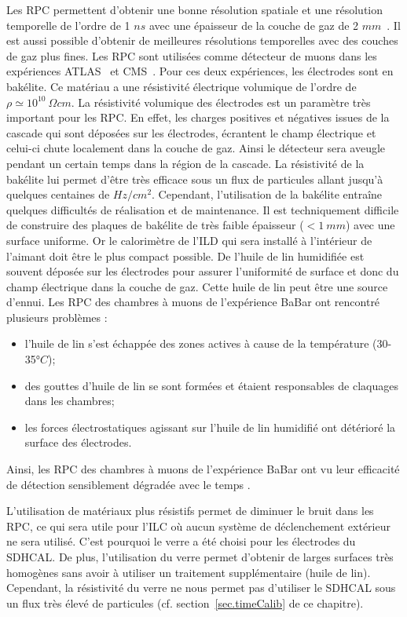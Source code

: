 Les RPC permettent d'obtenir une bonne résolution spatiale et une résolution temporelle de l'ordre de 1 $ns$ avec une épaisseur de la couche de gaz de 2 $mm$~\cite{riegler}. Il est aussi possible d'obtenir de meilleures résolutions temporelles avec des couches de gaz plus fines. Les RPC sont utilisées comme détecteur de muons dans les expériences ATLAS~\cite{atlas} et CMS~\cite{cms}. Pour ces deux expériences, les électrodes sont en bakélite. Ce matériau a une résistivité électrique volumique de l'ordre de $\rho\simeq10^{10}~\Omega cm$. La résistivité volumique des électrodes est un paramètre très important pour les RPC. En effet, les charges positives et négatives issues de la cascade qui sont déposées sur les électrodes, écrantent le champ électrique et celui-ci chute localement dans la couche de gaz. Ainsi le détecteur sera aveugle pendant un certain temps dans la région de la cascade. La résistivité de la bakélite lui permet d'être très efficace sous un flux de particules allant jusqu'à quelques centaines de $Hz/cm^2$. Cependant, l'utilisation de la bakélite entraîne quelques difficultés de réalisation et de maintenance. Il est techniquement difficile de construire des plaques de bakélite de très faible épaisseur ($<1~mm$) avec une surface uniforme. Or le calorimètre de l'ILD qui sera installé à l'intérieur de l'aimant doit être le plus compact possible. De l'huile de lin humidifiée est souvent déposée sur les électrodes pour assurer l'uniformité de surface et donc du champ électrique dans la couche de gaz. Cette huile de lin peut être une source d'ennui. Les RPC des chambres à muons de l'expérience BaBar ont rencontré plusieurs problèmes \cite{vavra}: 
\begin{itemize}
\item l'huile de lin s'est échappée des zones actives à cause de la température (30-35$°C$);
\item des gouttes d'huile de lin se sont formées et étaient responsables de claquages dans les chambres;
\item les forces électrostatiques agissant sur l'huile de lin humidifié ont détérioré la surface des électrodes.
\end{itemize}
Ainsi, les RPC des chambres à muons de l'expérience BaBar ont vu leur efficacité de détection sensiblement dégradée avec le temps \cite{1352718}. 

L'utilisation de matériaux plus résistifs permet de diminuer le bruit dans les RPC, ce qui sera utile pour l'ILC où aucun système de déclenchement extérieur ne sera utilisé. C'est pourquoi le verre a été choisi pour les électrodes du SDHCAL. De plus, l'utilisation du verre permet d'obtenir de larges surfaces très homogènes sans avoir à utiliser un traitement supplémentaire (huile de lin). Cependant, la résistivité du verre ne nous permet pas d'utiliser le SDHCAL sous un flux très élevé de particules (cf. section~\ref{sec.timeCalib} de ce chapitre). 

